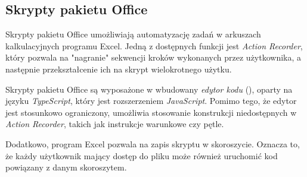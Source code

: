 \subsection{Skrypty pakietu Office \cite{o365devx_office_2023}}
Skrypty pakietu Office umożliwiają automatyzację zadań w arkuszach kalkulacyjnych programu Excel. Jedną z dostępnych funkcji jest \emph{Action Recorder}, który pozwala na "nagranie" sekwencji kroków wykonanych przez użytkownika, a następnie przekształcenie ich na skrypt wielokrotnego użytku.\par
Skrypty pakietu Office są wyposażone w wbudowany \emph{edytor kodu} (), oparty na języku \emph{TypeScript}, który jest rozszerzeniem \emph{JavaScript}. Pomimo tego, że edytor jest stosunkowo ograniczony, umożliwia stosowanie konstrukcji niedostępnych w \emph{Action Recorder}, takich jak instrukcje warunkowe czy pętle.\par
Dodatkowo, program Excel pozwala na zapis skryptu w skoroszycie. Oznacza to, że każdy użytkownik mający dostęp do pliku może również uruchomić kod powiązany z danym skoroszytem.